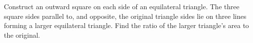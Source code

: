 Construct an outward square on each side of an equilateral triangle. The three square sides parallel to, and opposite, the original triangle sides lie on three lines forming a larger equilateral triangle. Find the ratio of the larger triangle's area to the original.
